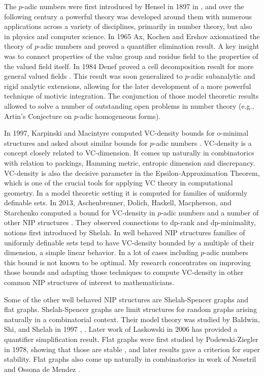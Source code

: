 The $p$-adic numbers were first introduced by Hensel in 1897 in \cite{hensel}, and over the following century a powerful theory was developed around them with numerous applications across a variety of disciplines, primarily in number theory, but also in physics and computer science.
In 1965 Ax, Kochen \cite{ak1} and Ershov \cite{er1} axiomatized the theory of $p$-adic numbers and proved a quantifier elimination result.
A key insight was to connect properties of the value group and residue field to the properties of the valued field itself.
In 1984 Denef proved a cell decomposition result for more general valued fields \cite{den84}.
This result was soon generalized to $p$-adic subanalytic and rigid analytic extensions, allowing for the later development of a more powerful technique of motivic integration.
The conjunction of those model theoretic results allowed to solve a number of outstanding open problems in number theory (e.g., Artin's Conjecture on $p$-adic homogeneous forms).

In 1997, Karpinski and Macintyre computed VC-density bounds for o-minimal structures and asked about similar bounds for $p$-adic numbers \cite{karp97}.
VC-density is a concept closely related to VC-dimension.
It comes up naturally in combinatorics with relation to packings, Hamming metric, entropic dimension and discrepancy.
 VC-density is also the decisive parameter in the Epsilon-Approximation Theorem, which is one of the crucial tools for applying VC theory in computational geometry.
In a model theoretic setting it is computed for families of uniformly definable sets.
 In 2013, Aschenbrenner, Dolich, Haskell, Macpherson, and Starchenko computed a bound for VC-density in $p$-adic numbers and a number of other NIP structures \cite{density}.
They observed connections to dp-rank and dp-minimality, notions first introduced by Shelah.
In well behaved NIP structures families of uniformly definable sets tend to have VC-density bounded by a multiple of their dimension, a simple linear behavior.
In a lot of cases including $p$-adic numbers this bound is not known to be optimal.
My research concentrates on improving those bounds and adapting those techniques to compute VC-density in other common NIP structures of interest to mathematicians.

Some of the other well behaved NIP structures are Shelah-Spencer graphs and flat graphs.
Shelah-Spencer graphs are limit structures for random graphs arising naturally in a combinatorial context.
Their model theory was studied by Baldwin, Shi, and Shelah in 1997 \cite{shi}, \cite{baldwin}.
Later work of Laskowski in 2006 \cite{laskowski} has provided a quantifier simplification result.
 Flat graphs were first studied by Podewski-Ziegler in 1978, showing that those are stable \cite{stable_graphs}, and later results gave a criterion for super stability.
Flat graphs also come up naturally in combinatorics in work of Nesetril and Ossona de Mendez \cite{nowhere}.

